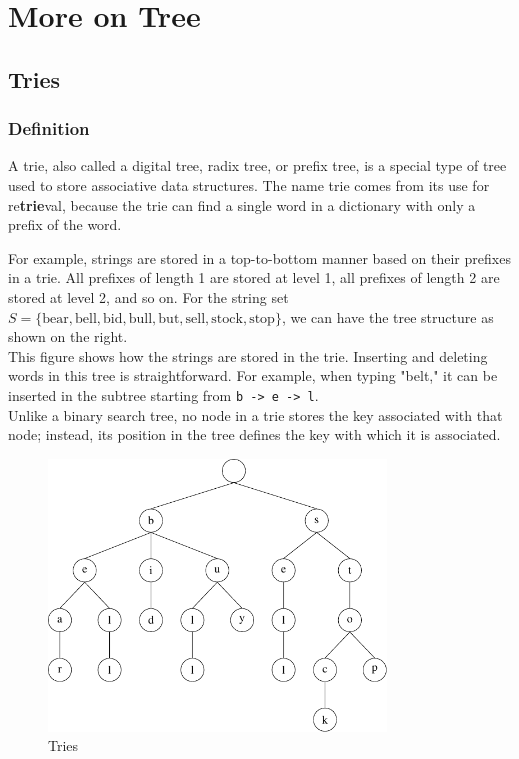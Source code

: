\chapter{More on Tree}

\section{Tries}
\subsection{Definition}
A trie, also called a digital tree, radix tree, or prefix tree, is a special type of tree used to store associative data structures. The name trie comes from its use for re\textbf{trie}val, because the trie can find a single word in a dictionary with only a prefix of the word. 

\begin{minipage}{0.5\textwidth}
For example, strings are stored in a top-to-bottom manner based on their prefixes in a trie. All prefixes of length 1 are stored at level 1, all prefixes of length 2 are stored at level 2, and so on. For the string set \( S = \{ \text{bear}, \text{bell}, \text{bid}, \text{bull}, \text{but}, \text{sell}, \text{stock}, \text{stop} \} \), we can have the tree structure as shown on the right. \\[3pt]
This figure shows how the strings are stored in the trie. Inserting and deleting words in this tree is straightforward. For example, when typing "belt," it can be inserted in the subtree starting from \verb|b -> e -> l|. \\[3pt]
Unlike a binary search tree, no node in a trie stores the key associated with that node; instead, its position in the tree defines the key with which it is associated.
\end{minipage}
\begin{minipage}{0.5\textwidth}
\begin{figure}[H]
  \centering
  \includegraphics[width=0.8\textwidth]{Figure/Tries.pdf}
  \caption{Tries}
\end{figure}
\end{minipage}

